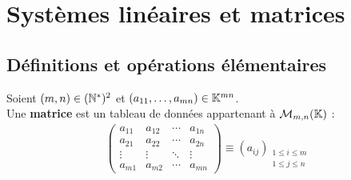 \chapter{Systèmes linéaires et matrices}
\def\arraystretch{1}

\section{Définitions et opérations élémentaires}
\begin{definition}[Matrice]
	Soient $(m,n) \in (\mathbb{N}^*)^2$ et $(a_{11}, \ldots, a_{mn}) \in \mathbb{K}^{mn}$. \\
    Une \textbf{matrice} est un tableau de données appartenant à $\mathcal{M}_{m,n} (\mathbb{K})$ :
    \begin{align*}
        \begin{pmatrix}
            a_{11} & a_{12} & \cdots & a_{1n} \\
            a_{21} & a_{22} & \cdots & a_{2n} \\
            \vdots & \vdots & \ddots & \vdots \\
            a_{m1} & a_{m2} & \cdots & a_{mn}
        \end{pmatrix}
        \equiv 
        (a_{ij})_{\substack{1 \leq i \leq m \\ 1 \leq j \leq n}}
    \end{align*}
\end{definition}

